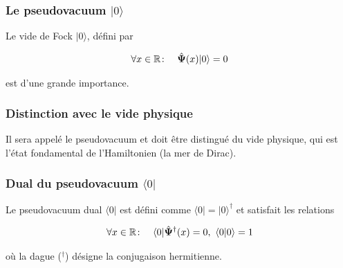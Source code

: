 \subsubsection{Le pseudovacuum $\vert 0 \rangle$}

Le vide de Fock $\vert 0 \rangle$, défini par 


\begin{eqnarray}
	\forall x \in \mathbb{R} & \colon & \hat{\bm{\Psi}} (x) \vert 0 \rangle = 	0 \label{eq.1.4}
\end{eqnarray}

est d'une grande importance.

\subsubsection{Distinction avec le vide physique}

Il sera appelé le pseudovacuum et doit être distingué du vide physique, qui est l'état fondamental de l'Hamiltonien (la mer de Dirac). 

\subsubsection{Dual du pseudovacuum $\langle 0 \vert$}

Le pseudovacuum dual $\langle 0 \vert$ est défini comme $\langle 0 \vert = \vert 0 \rangle^\dag$ et satisfait les relations 

\begin{eqnarray}
	\forall x \in \mathbb{R} & \colon & \langle 0 \vert \hat{\bm{\Psi}}^\dag (x)  = 	0, ~\langle 0 \vert 0 \rangle = 1 
\end{eqnarray}

où la dague ($^\dag$) désigne la conjugaison hermitienne.

